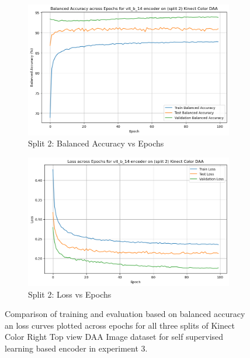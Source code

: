 \begin{figure}[htbp]
    \begin{subfigure}[b]{0.45\textwidth}
        \includegraphics[width=\textwidth]{Images_Thesis/Tensboard_runs_images_all/Experiment_02_Sel_Sup_D_A_no_Aug/Split_2/output_bal_acc_split_2_d_a_ssl.png}
        \caption{Split 2: Balanced Accuracy vs Epochs}
        \label{fig:Exp_3_05}
    \end{subfigure}
    \hfill
    \begin{subfigure}[b]{0.45\textwidth}
        \includegraphics[width=\textwidth]{Images_Thesis/Tensboard_runs_images_all/Experiment_02_Sel_Sup_D_A_no_Aug/Split_2/output_loss_split_2_d_a_ssl.png}
        \caption{Split 2: Loss vs Epochs}
        \label{fig:Exp_3_06}
    \end{subfigure}
    \caption[Results of Experiment 3: Self Supervised Learning Based Encoder]{Comparison of training and evaluation based on balanced accuracy an loss curves plotted across epochs for all three splits of Kinect Color Right Top view DAA Image dataset for self supervised learning based encoder in experiment 3.}
    \label{fig:Exp_3_00}
\end{figure}

